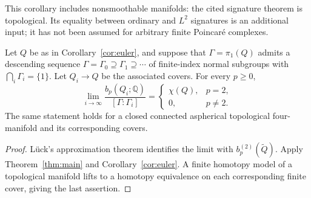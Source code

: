This corollary includes nonsmoothable manifolds: the cited signature
theorem is topological. Its equality between ordinary and $L^2$
signatures is an additional input; it has not been assumed for
arbitrary finite Poincar\'e complexes.

\begin{corollary}\label{cor:betti-growth}
Let $Q$ be as in Corollary~\ref{cor:euler}, and suppose that
$\Gamma=\pi_1(Q)$ admits a descending sequence
$\Gamma=\Gamma_0\supseteq\Gamma_1\supseteq\cdots$ of finite-index
normal subgroups with $\bigcap_i\Gamma_i=\{1\}$.
Let $Q_i\to Q$ be the associated covers. For every $p\ge0$,
\[
 \lim_{i\to\infty}
 \frac{b_p(Q_i;\mathbb Q)}{[\Gamma:\Gamma_i]}
 =\begin{cases}
   \chi(Q),&p=2,\\
   0,&p\ne2.
  \end{cases}
\]
The same statement holds for a closed connected aspherical topological
four-manifold and its corresponding covers.
\end{corollary}
\begin{proof}
L\"uck's approximation theorem
\cite[Theorem~0.1]{Luck1994Approximation} identifies the limit with
$b_p^{(2)}(\widetilde Q)$. Apply Theorem~\ref{thm:main} and
Corollary~\ref{cor:euler}.
A finite homotopy model of a topological manifold lifts to a homotopy
equivalence on each corresponding finite cover, giving the last assertion.
\end{proof}
